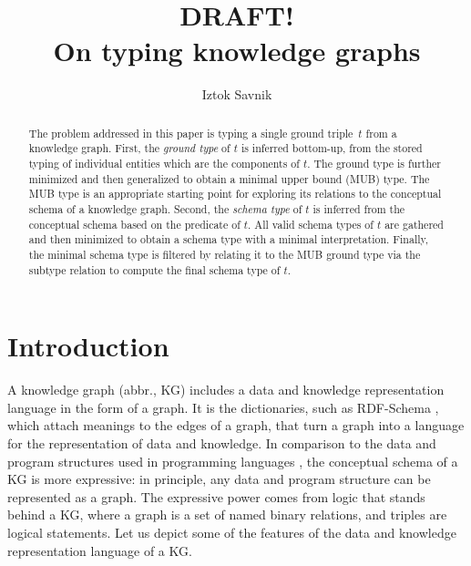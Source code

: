 \documentclass[runningheads]{llncs}
\begin{document}
\title{DRAFT! \\ On typing knowledge graphs}

\author{Iztok Savnik} 



\maketitle

\begin{abstract}
  The problem addressed in this paper is typing a single ground
  triple~$t$ from a knowledge graph. First, the \emph{ground type} of
  $t$ is inferred bottom-up, from the stored typing of individual
  entities which are the components of $t$. The ground type is further
  minimized and then generalized to obtain a minimal upper bound (MUB)
  type. The MUB type is an appropriate starting point for exploring
  its relations to the conceptual schema of a knowledge graph. Second,
  the \emph{schema type} of $t$ is inferred from the conceptual schema
  based on the predicate of $t$. All valid schema types of $t$ are
  gathered and then minimized to obtain a schema type with a minimal
  interpretation. Finally, the minimal schema type is filtered by
  relating it to the MUB ground type via the subtype relation to
  compute the final schema type of $t$.

\end{abstract}


\thispagestyle{headings}




\section{Introduction}

A knowledge graph (abbr., KG) includes a data and knowledge
representation language in the form of a graph. It is the
dictionaries, such as RDF-Schema \cite{rdfschema}, which attach
meanings to the edges of a graph, that turn a graph into a language
for the representation of data and knowledge. In comparison to the
data and program structures used in programming languages
\cite{Pierce2002,Hindley1997}, the conceptual schema of a KG is more
expressive: in principle, any data and program structure can be
represented as a graph. The expressive power comes from logic that
stands behind a KG, where a graph is a set of named binary relations,
and triples are logical statements. Let us depict some of the features
of the data and knowledge representation language of a KG.
\end{document}
